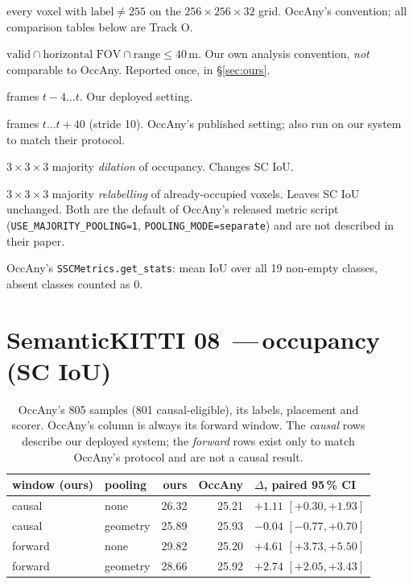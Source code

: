 \documentclass[11pt,a4paper]{article}
\newcommand{\us}{\textbf{ours}}
\newcommand{\nm}{\,---\,}
\begin{document}
\begin{description}\itemsep2pt
  \item[Track O] every voxel with $\text{label}\neq255$ on the $256\times256\times32$ grid. OccAny's
        convention; all comparison tables below are Track O.
  \item[Track P] $\text{valid}\cap\text{horizontal FOV}\cap\text{range}\le40$\,m. Our own analysis
        convention, \emph{not} comparable to OccAny. Reported once, in \S\ref{sec:ours}.
  \item[causal window] frames $t{-}4\ldots t$. Our deployed setting.
  \item[forward window] frames $t\ldots t{+}40$ (stride 10). OccAny's published setting; also run on
        our system to match their protocol.
  \item[geometry pooling] $3\times3\times3$ majority \emph{dilation} of occupancy. Changes SC IoU.
  \item[semantic pooling] $3\times3\times3$ majority \emph{relabelling} of already-occupied voxels.
        Leaves SC IoU unchanged. Both are the default of OccAny's released metric script
        (\texttt{USE\_MAJORITY\_POOLING=1}, \texttt{POOLING\_MODE=separate}) and are not described in
        their paper.
  \item[SSC mIoU] OccAny's \texttt{SSCMetrics.get\_stats}: mean IoU over all 19 non-empty classes,
        absent classes counted as $0$.
\end{description}

\section{SemanticKITTI 08 \nm occupancy (SC IoU)}

\begin{table}[h]\centering
\begin{tabular}{llrrl}
\toprule
window (ours) & pooling & \us & OccAny & $\Delta$, paired 95\,\% CI \\
\midrule
causal  & none     & 26.32 & 25.21 & $+1.11$ $[+0.30,+1.93]$ \\
causal  & geometry & 25.89 & 25.93 & $\mathbf{-0.04}$ $[-0.77,+0.70]$ \\
forward & none     & 29.82 & 25.20 & $+4.61$ $[+3.73,+5.50]$ \\
forward & geometry & 28.66 & 25.92 & $+2.74$ $[+2.05,+3.43]$ \\
\bottomrule
\end{tabular}
\caption{OccAny's 805 samples (801 causal-eligible), its labels, placement and scorer. OccAny's column
is always its forward window. The \emph{causal} rows describe our deployed system; the \emph{forward}
rows exist only to match OccAny's protocol and are not a causal result.}
\end{table}
\end{document}
